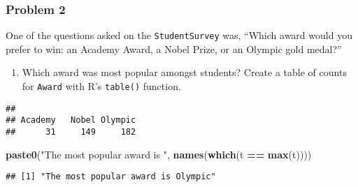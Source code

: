 \documentclass[]{article}
\newenvironment{Shaded}{\begin{snugshade}}{\end{snugshade}}
\newcommand{\KeywordTok}[1]{\textcolor[rgb]{0.13,0.29,0.53}{\textbf{#1}}}
\newcommand{\NormalTok}[1]{#1}
\newcommand{\OperatorTok}[1]{\textcolor[rgb]{0.81,0.36,0.00}{\textbf{#1}}}
\newcommand{\StringTok}[1]{\textcolor[rgb]{0.31,0.60,0.02}{#1}}
\providecommand{\tightlist}{%
  \setlength{\itemsep}{0pt}\setlength{\parskip}{0pt}}
\begin{document}
\hypertarget{problem-2}{%
\subsubsection{Problem 2}\label{problem-2}}

One of the questions asked on the \texttt{StudentSurvey} was, ``Which
award would you prefer to win: an Academy Award, a Nobel Prize, or an
Olympic gold medal?''

\begin{enumerate}
\def\labelenumi{\alph{enumi})}
\tightlist
\item
  Which award was most popular amongst students? Create a table of
  counts for \texttt{Award} with R's \texttt{table()} function.
\end{enumerate}

\begin{Shaded}
\end{Shaded}

\begin{verbatim}
## 
## Academy   Nobel Olympic 
##      31     149     182
\end{verbatim}

\begin{Shaded}
\begin{Highlighting}[]
\KeywordTok{paste0}\NormalTok{(}\StringTok{"The most popular award is "}\NormalTok{, }\KeywordTok{names}\NormalTok{(}\KeywordTok{which}\NormalTok{(t }\OperatorTok{==}\StringTok{ }\KeywordTok{max}\NormalTok{(t))))}
\end{Highlighting}
\end{Shaded}

\begin{verbatim}
## [1] "The most popular award is Olympic"
\end{verbatim}
\end{document}
